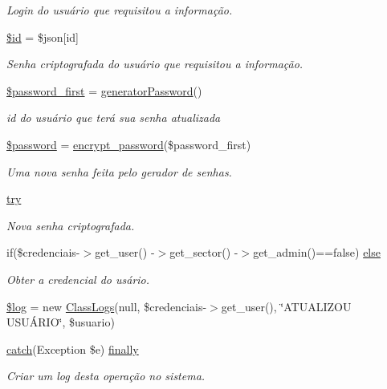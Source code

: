 \begin{DoxyCompactItemize}
\begin{DoxyCompactList}\small\item\em Login do usuário que requisitou a informação. \end{DoxyCompactList}\item 
\hyperlink{password_8php_ae97941710d863131c700f069b109991e}{\$id} = \$json\mbox{[}\textquotesingle{}id\textquotesingle{}\mbox{]}
\begin{DoxyCompactList}\small\item\em Senha criptografada do usuário que requisitou a informação. \end{DoxyCompactList}\item 
\hyperlink{password_8php_af783a443753ce1fd9e40b31f263e10aa}{\$password\+\_\+first} = \hyperlink{_header_8php_a8db8ce321ecc739cc840efd11c612b10}{generator\+Password}()
\begin{DoxyCompactList}\small\item\em id do usuário que terá sua senha atualizada \end{DoxyCompactList}\item 
\hyperlink{password_8php_a607686ef9f99ea7c42f4f3dd3dbb2b0d}{\$password} = \hyperlink{_header_8php_a5455ea8d21f7611dae58e3d4612fb3bd}{encrypt\+\_\+password}(\$password\+\_\+first)
\begin{DoxyCompactList}\small\item\em Uma nova senha feita pelo gerador de senhas. \end{DoxyCompactList}\item 
\hyperlink{password_8php_abe4cc9788f52e49485473dc699537388}{try}
\begin{DoxyCompactList}\small\item\em Nova senha criptografada. \end{DoxyCompactList}\item 
if(\$credenciais-\/$>$get\+\_\+user() -\/$>$get\+\_\+sector() -\/$>$get\+\_\+admin()==false) \hyperlink{password_8php_a8f5108ee2efdbfcd6f3d53b8abcb6c09}{else}
\begin{DoxyCompactList}\small\item\em Obter a credencial do usário. \end{DoxyCompactList}\item 
\hyperlink{password_8php_a9a2cf15a653aee8be437f7ae474cd494}{\$log} = new \hyperlink{class_class_logs}{Class\+Logs}(null, \$credenciais-\/$>$get\+\_\+user(), \char`\"{}A\+T\+U\+A\+L\+I\+Z\+OU U\+S\+UÁ\+R\+IO\char`\"{}, \$usuario)
\item 
\hyperlink{imprimir_2ficha_2index_8php_a8104793004944f01dd070fc8b1ade3c4}{catch}(Exception \$e) \hyperlink{password_8php_a1eb47d68a4a4f73debf91b15e179d813}{finally}
\begin{DoxyCompactList}\small\item\em Criar um log desta operação no sistema. \end{DoxyCompactList}\end{DoxyCompactItemize}


